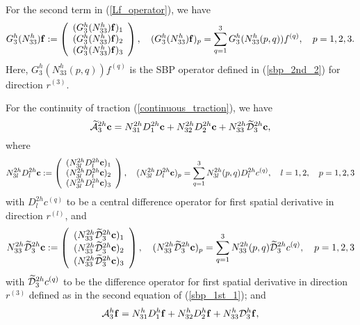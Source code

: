 For the second term in (\ref{Lf_operator}), we have
\begin{align*}%
{{G}}_3^{h}({N}_{33}^{h}){\bf f} := \left(\begin{array}{c}
({{G}}_3^{h}({N}_{33}^{h}){\bf f})_1 \\
({{G}}_3^{h}({N}_{33}^{h}){\bf f})_2 \\
({{G}}_3^{h}({N}_{33}^{h}){\bf f})_3 
\end{array}\right), \quad ({{G}}_3^{h}({N}_{33}^{h}){\bf f})_p = \sum_{q = 1}^{3} {G}_3^{h}(N_{33}^{h}(p,q)) {f}^{(q)},\quad p = 1,2,3.
\end{align*}
Here, ${G}_3^{h}(N_{33}^{h}(p,q)) {f}^{(q)}$ is the SBP operator defined in (\ref{sbp_2nd_2}) for direction $r^{(3)}$. 

For the continuity of traction (\ref{continuous_traction}), we have \[\widetilde{\mathcal{A}}^{2h}_3{\bf c} = N_{31}^{2h}D_1^{2h}{\bf c}+N_{32}^{2h}D_2^{2h}{\bf c}+N_{33}^{2h}\widetilde{\mathcal D}_3^{2h}{\bf c},\]
where
\begin{align*}%
{N}_{3l}^{2h}D_l^{2h}{\bf c} := \left(\begin{array}{c}
({N}_{3l}^{2h}D_l^{2h}{\bf c})_1 \\
({N}_{3l}^{2h}D_l^{2h}{\bf c})_2 \\
({N}_{3l}^{2h}D_l^{2h}{\bf c})_3 
\end{array}\right), \quad ({N}_{3l}^{2h}D_l^{2h}{\bf c})_p = \sum_{q = 1}^{3} N_{3l}^{2h}(p,q)D_l^{2h}{c}^{(q)},\quad l = 1,2, \quad p = 1,2,3
\end{align*}
with $D_l^{2h}{c}^{(q)}$ to be a central difference operator for first spatial derivative in direction $r^{(l)}$, and
\begin{align*}%
{N}_{33}^{2h}\wt{\mathcal{D}}_3^{2h}{\bf c} := \left(\begin{array}{c}
({N}_{33}^{2h}\wt{\mathcal{D}}_3^{2h}{\bf c})_1 \\
({N}_{33}^{2h}\wt{\mathcal{D}}_3^{2h}{\bf c})_2 \\
({N}_{33}^{2h}\wt{\mathcal{D}}_3^{2h}{\bf c})_3 
\end{array}\right), \quad ({N}_{33}^{2h}\wt{\mathcal{D}}_3^{2h}{\bf c})_p = \sum_{q = 1}^{3} N_{33}^{2h}(p,q)\wt{\mathcal{D}}_3^{2h}{c}^{(q)},\quad p = 1,2,3
\end{align*}
with $\widetilde{\mathcal{D}}_3^{2h}{c}^{(q)}$ to be the difference operator for first spatial derivative in direction $r^{(3)}$ defined as in the second equation of (\ref{sbp_1st_1}); and 
\[\mathcal{A}_3^h{\bf f} = N_{31}^hD_1^h{\bf f}+N_{32}^hD_2^h{\bf f}+N_{33}^h\mathcal{D}_3^h{\bf f},\]
